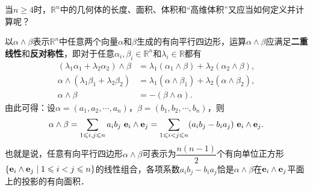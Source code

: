 \documentclass[a4paper,fontset=windows]{ctexbook}
\theoremstyle{definition}
\renewcommand{\le}{\leqslant}
\renewcommand{\ge}{\geqslant}
\begin{document}
当$n\ge 4$时，$\mathbb{R}^n$中的几何体的长度、面积、体积和“高维体积”又应当如何定义并计算呢？

以$\alpha\wedge\beta$表示$\mathbb{R}^n$中任意两个向量$\alpha$和$\beta$生成的有向平行四边形，运算$\alpha\wedge\beta$应满足{\bf 二重线性}和{\bf 反对称性}，即对于任意$\alpha_i,\beta_i\in\mathbb{R}^n$和$\lambda_i\in\mathbb{R}$都有
\begin{align*}
(\lambda_1\alpha_1+\lambda_2\alpha_2)\wedge\beta&=\lambda_1(\alpha_1\wedge\beta)+\lambda_2(\alpha_2\wedge\beta), \\
\alpha\wedge(\lambda_1\beta_1+\lambda_2\beta_2)&=\lambda_1(\alpha\wedge\beta_1)+\lambda_2(\alpha\wedge\beta_2), \\
\alpha\wedge\beta&=-(\beta\wedge\alpha).
\end{align*}
由此可得：设$\alpha=(a_1,a_2,\cdots,a_n)$，$\beta=(b_1,b_2,\cdots,b_n)$，则
$$\alpha\wedge\beta=\sum_{1\le i,j\le n}a_ib_j~{\bf e}_i\wedge{\bf e}_j=\sum_{1\le i<j\le n}(a_ib_j-b_ia_j)~{\bf e}_i\wedge{\bf e}_j.$$
也就是说，任意有向平行四边形$\alpha\wedge\beta$可表示为$\dfrac{n(n-1)}{2}$个有向单位正方形$\{{\bf e}_i\wedge{\bf e}_j\mid 1\le i<j\le n\}$的线性组合，各项系数$a_ib_j-b_ia_j$恰是$\alpha\wedge\beta$在${\bf e}_i\wedge{\bf e}_j$平面上的投影的有向面积．
\end{document}
